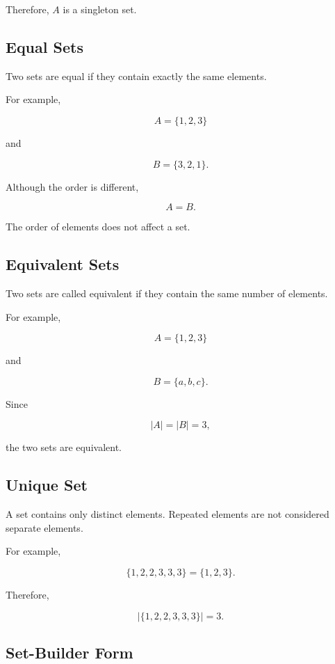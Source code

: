 \documentclass[12pt,a4paper]{article}
\begin{document}
Therefore, $A$ is a singleton set.


\subsection{Equal Sets}

Two sets are equal if they contain exactly the same elements.

For example,

\[
A=\{1,2,3\}
\]

and

\[
B=\{3,2,1\}.
\]

Although the order is different,

\[
A=B.
\]

The order of elements does not affect a set.


\subsection{Equivalent Sets}

Two sets are called equivalent if they contain the same number of elements.

For example,

\[
A=\{1,2,3\}
\]

and

\[
B=\{a,b,c\}.
\]

Since

\[
|A|=|B|=3,
\]

the two sets are equivalent.


\subsection{Unique Set}

A set contains only distinct elements. Repeated elements are not considered
separate elements.

For example,

\[
\{1,2,2,3,3,3\}
=
\{1,2,3\}.
\]

Therefore,

\[
|\{1,2,2,3,3,3\}|=3.
\]


\subsection{Set-Builder Form}
\end{document}
